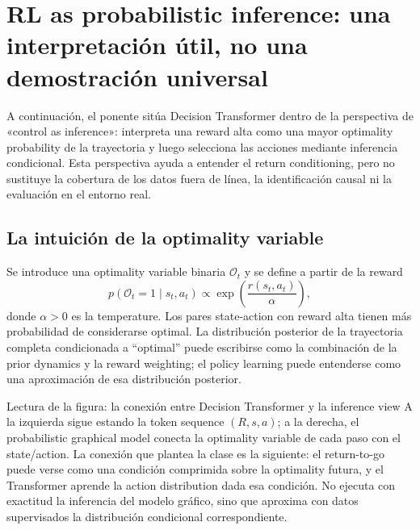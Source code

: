 \section{RL as probabilistic inference: una interpretación útil, no una demostración universal}

A continuación, el ponente sitúa Decision Transformer dentro de la perspectiva de «control as inference»: interpreta una reward alta como una mayor optimality probability de la trayectoria y luego selecciona las acciones mediante inferencia condicional. Esta perspectiva ayuda a entender el return conditioning, pero no sustituye la cobertura de los datos fuera de línea, la identificación causal ni la evaluación en el entorno real.

\subsection{La intuición de la optimality variable}

Se introduce una optimality variable binaria $\mathcal{O}_t$ y se define a partir de la reward
\[
p(\mathcal{O}_t=1\mid s_t,a_t)\propto \exp\left(\frac{r(s_t,a_t)}{\alpha}\right),
\]
donde $\alpha>0$ es la temperature. Los pares state-action con reward alta tienen más probabilidad de considerarse optimal. La distribución posterior de la trayectoria completa condicionada a ``optimal'' puede escribirse como la combinación de la prior dynamics y la reward weighting; el policy learning puede entenderse como una aproximación de esa distribución posterior.


\begin{knowledgebox}{Lectura de la figura: la conexión entre Decision Transformer y la inference view}
A la izquierda sigue estando la token sequence $(R,s,a)$; a la derecha, el probabilistic graphical model conecta la optimality variable de cada paso con el state/action. La conexión que plantea la clase es la siguiente: el return-to-go puede verse como una condición comprimida sobre la optimality futura, y el Transformer aprende la action distribution dada esa condición. No ejecuta con exactitud la inferencia del modelo gráfico, sino que aproxima con datos supervisados la distribución condicional correspondiente.
\end{knowledgebox}

